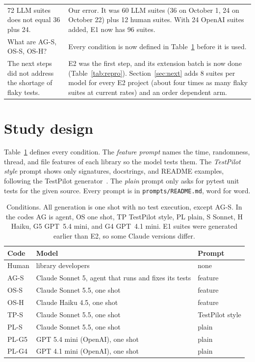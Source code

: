 \documentclass[sigconf,nonacm]{acmart}
\begin{document}
\begin{table}[t]
\begin{tabularx}{\textwidth}{p{5.0cm}X}
72 LLM suites does not equal 36 plus 24. & Our error. It was 60 LLM suites (36 on October 1, 24 on October 22) plus 12 human suites. With 24 OpenAI suites added, E1 now has 96 suites. \\
What are AG-S, OS-S, OS-H? & Every condition is now defined in Table~\ref{tab:conds} before it is used. \\
The next steps did not address the shortage of flaky tests. & E2 was the first step, and its extension batch is now done (Table~\ref{tab:repro}). Section~\ref{sec:next} adds 8 suites per model for every E2 project (about four times as many flaky suites at current rates) and an order dependent arm. \\
\bottomrule
\end{tabularx}
\end{table}

\section{Study design}
\label{sec:design}
Table~\ref{tab:conds} defines every condition. The \emph{feature prompt} names the time, randomness, thread, and file features of each library so the model tests them. The \emph{TestPilot style} prompt shows only signatures, docstrings, and README examples, following the TestPilot generator~\cite{schafer2024}. The \emph{plain} prompt only asks for pytest unit tests for the given source. Every prompt is in \texttt{prompts/README.md}, word for word.

\begin{table}[h]
\caption{Conditions. All generation is one shot with no test execution, except AG-S. In the codes AG is agent, OS one shot, TP TestPilot style, PL plain, S Sonnet, H Haiku, G5 GPT~5.4 mini, and G4 GPT~4.1 mini. E1 suites were generated earlier than E2, so some Claude versions differ.}
\label{tab:conds}
\small
\begin{tabularx}{\columnwidth}{lXl}
\toprule
Code & Model & Prompt \\
\midrule
Human & library developers & none \\
AG-S & Claude Sonnet 5, agent that runs and fixes its tests & feature \\
OS-S & Claude Sonnet 5.5, one shot & feature \\
OS-H & Claude Haiku 4.5, one shot & feature \\
TP-S & Claude Sonnet 5.5, one shot & TestPilot style \\
PL-S & Claude Sonnet 5.5, one shot & plain \\
PL-G5 & GPT 5.4 mini (OpenAI), one shot & plain \\
PL-G4 & GPT 4.1 mini (OpenAI), one shot & plain \\
\bottomrule
\end{tabularx}
\end{table}
\end{document}
